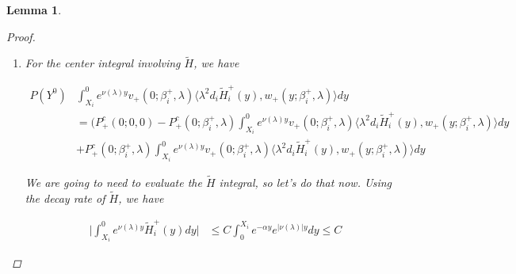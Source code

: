 \documentclass[12pt]{article}
\newtheorem{lemma}{Lemma}
\begin{document}
\begin{lemma}
\begin{proof}
\begin{enumerate}
The second one has bound

\begin{align*}
\int_0^{X_i} &e^{|\nu(\lambda)|y} e^{-\alpha X_i} e^{-\alpha (X_i - y)} e^{-\tilde{\alpha}(X_i - y)}|D||d|  dy \leq |D| |d| e^{-\alpha X_m } \int_0^{X_i} e^{-(\alpha + \tilde{\alpha})(X_i - y) } dy \\
&\leq C e^{-\alpha X_m } |D||d|
\end{align*}

The last one has bound

\begin{align*}
( e^{-\alpha X_m}( |c^-| + |D| ) + |\lambda|^2) |d| &\int_0^{X_i} e^{|\nu(\lambda)|y} e^{-\alpha X_i} e^{-\alpha (X_i - y)} dy \leq C e^{-\tilde{\alpha} X_m } ( e^{-\alpha X_m}( |c^-| + |D| ) + |\lambda|^2) |d|
\end{align*}

All together, the bound is

\begin{align*}
\Big| P(Y^0) &\int_{X_i}^0 e^{\nu(\lambda)y} v_+(0; \beta_i^+, \lambda) \langle G_i^+(y)W_i^+(y), w_+(y; \beta_i^+, \lambda) \rangle dy \Big| \\
&\leq C e^{-\alpha X_m} ( |c^-| + (|\lambda|^2 + |D|) |d| )
\end{align*}

\item For the center integral involving $\tilde{H}$, we have

\begin{align*}
P(Y^0) &\int_{X_i}^0 e^{\nu(\lambda)y} v_+(0; \beta_i^+, \lambda) \langle \lambda^2 d_i \tilde{H}_i^+(y), w_+(y; \beta_i^+, \lambda) \rangle dy \\
&= ( P^c_+(0; 0, 0) - P^c_+(0; \beta_i^+, \lambda) \int_{X_i}^0 e^{\nu(\lambda)y} v_+(0; \beta_i^+, \lambda) \langle \lambda^2 d_i \tilde{H}_i^+(y), w_+(y; \beta_i^+, \lambda) \rangle dy \\
&+ P^c_+(0; \beta_i^+, \lambda) \int_{X_i}^0 e^{\nu(\lambda)y} v_+(0; \beta_i^+, \lambda) \langle \lambda^2 d_i \tilde{H}_i^+(y), w_+(y; \beta_i^+, \lambda) \rangle dy 
\end{align*}

We are going to need to evaluate the $\tilde{H}$ integral, so let's do that now. Using the decay rate of $\tilde{H}$, we have

\begin{align*}
\Big| \int_{X_i}^0 e^{\nu(\lambda)y} \tilde{H}_i^+(y) dy \Big| 
&\leq C \int_0^{X_i} e^{-\alpha y} e^{|\nu(\lambda)| y} dy \leq C
\end{align*}


\end{enumerate}
\end{proof}
\end{lemma}
\end{document}
